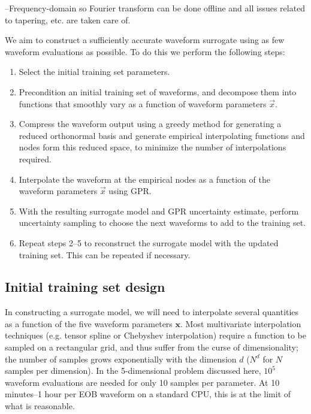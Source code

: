 \documentclass[prd,aps,letter,twocolumn,floatfix,notitlepage]{revtex4-1}
\begin{document}
--Frequency-domain so Fourier transform can be done offline and all issues related to tapering, etc. are taken care of.

We aim to construct a sufficiently accurate waveform surrogate using as few waveform evaluations as possible.
To do this we perform the following steps:
\begin{enumerate}
\item Select the initial training set parameters.

\item Precondition an initial training set of waveforms, and decompose them into functions that smoothly vary
as a function of waveform parameters $\vec x$. 

\item Compress the waveform output using a greedy method for generating a reduced orthonormal basis and 
generate empirical interpolating functions and nodes form this reduced space, to minimize the number of interpolations
required.

\item Interpolate the waveform at the empirical nodes as a function of the waveform parameters $\vec x$ using GPR.

\item With the resulting surrogate model and GPR uncertainty estimate, perform uncertainty sampling to choose the 
next waveforms to add to the training set.

\item Repeat steps 2--5 to reconstruct the surrogate model with the updated training set. This can be repeated
if necessary.
\end{enumerate}

\subsection{Initial training set design}

In constructing a surrogate model, we will need to interpolate several quantities as a function of the five
waveform parameters ${\bm x}$.
Most multivariate interpolation techniques (e.g. tensor spline or Chebyshev interpolation) 
require a function to be sampled on a rectangular grid, and thus suffer from the curse of dimensionality; 
the number of samples grows exponentially with the dimension $d$ ($N^d$ for $N$ samples per dimension).
In the 5-dimensional problem discussed here, $10^5$ waveform evaluations are needed for only 10 samples per parameter.
At 10 minutes--1 hour per EOB waveform on a standard CPU, this is at the limit of what is reasonable.
\end{document}
